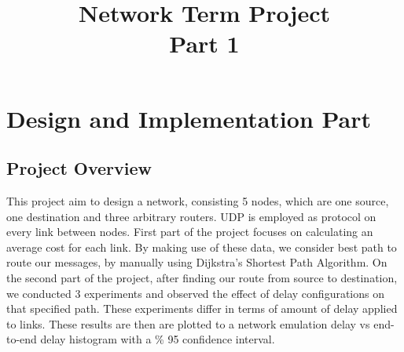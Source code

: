 \documentclass[conference]{IEEEtran}
\begin{document}
\title{Network Term Project\\ Part 1}
\author{
\and
{}
}

\maketitle

\section{Design and Implementation Part}
\subsection{Project Overview}

This project aim to design a network, consisting 5 nodes, which are one source, one destination and three arbitrary routers. UDP is employed as protocol on every link between nodes. First part of the project focuses on calculating an average cost for each link. By making use of these data, we consider best path to route our messages, by manually using Dijkstra's Shortest Path Algorithm. On the second part of the project, after finding our route from source to destination, we conducted 3 experiments and observed the effect of delay configurations on that specified path. These experiments differ in terms of amount of delay applied to links. These results are then are plotted to a network emulation delay vs end-to-end delay histogram with a \% 95 confidence interval.
\end{document}

